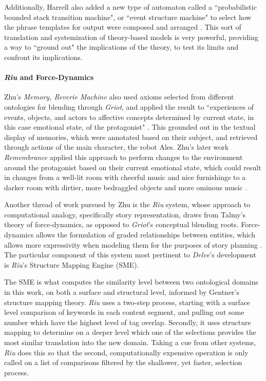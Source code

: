 Additionally, Harrell also added a new type of automaton called a ``probabilistic bounded stack transition machine", or ``event structure machine" to select how the phrase templates for output were composed and arranged \cite{goguen2010style}. This sort of translation and systemization of theory-based models is very powerful, providing a way to ``ground out" the implications of the theory, to test its limits and confront its implications.

\paragraph{\textit{Riu} and Force-Dynamics}\label{par:riu-and-force-dynamics}

Zhu’s \textit{Memory, Reverie Machine} also used axioms selected from different ontologies for blending through \textit{Griot}, and applied the result to ``experiences of events, objects, and actors to affective concepts determined by current state, in this case emotional state, of the protagonist" \cite{zhu_harrell_2011}. This grounded out in the textual display of memories, which were annotated based on their subject, and retrieved through actions of the main character, the robot Ales. Zhu’s later work \textit{Remembrance} applied this approach to perform changes to the environment around the protagonist based on their current emotional state, which could result in changes from a well-lit room with cheerful music and nice furnishings to a darker room with dirtier, more bedraggled objects and more ominous music \cite{zhu2011representing}.

Another thread of work pursued by Zhu is the \textit{Riu} system, whose approach to computational analogy, specifically story representation, draws from Talmy’s theory of force-dynamics, as opposed to \textit{Griot}’s conceptual blending roots. Force-dynamics allows the formulation of graded relationships between entities, which allows more expressivity when modeling them for the purposes of story planning \cite{zhu2010story}. The particular component of this system most pertinent to \textit{Delve}'s development is \textit{Riu}’s Structure Mapping Engine (SME). 

The SME is what computes the similarity level between two ontological domains in this work, on both a surface and structural level, informed by Gentner’s structure mapping theory. \textit{Riu} uses a two-step process, starting with a surface level comparison of keywords in each content segment, and pulling out some number which have the highest level of tag overlap. Secondly, it uses structure mapping to determine on a deeper level which one of the selections provides the most similar translation into the new domain. Taking a cue from other systems, \textit{Riu} does this so that the second, computationally expensive operation is only called on a list of comparisons filtered by the shallower, yet faster, selection process.

